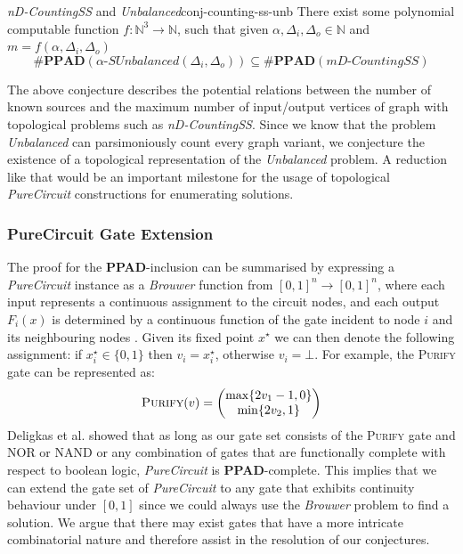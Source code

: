 \begin{conjecturebox}{\textit{nD-CountingSS} and \textit{Unbalanced}}{conj-counting-ss-unb}
    There exist some polynomial computable function $f :\mathbb{N}^3 \to \mathbb{N}$, such that
    given $\alpha,\Delta_i, \Delta_o \in \mathbb{N}$ and $m= f(\alpha, \Delta_i, \Delta_o)$
    $$
        \textbf{\#PPAD}(\alpha\textit{-SUnbalanced}(\Delta_i, \Delta_o)) \subseteq
        \textbf{\#PPAD}(m\textit{D-CountingSS})
    $$
\end{conjecturebox}
The above conjecture describes the potential relations between the number of known sources and the
maximum number of input/output vertices of graph with topological problems
such as \textit{nD-CountingSS}. Since we know that the problem \textit{Unbalanced}
can parsimoniously count every graph variant, we conjecture the existence of a topological representation
of the \textit{Unbalanced} problem. A reduction like that would be an important milestone for the usage of topological \textit{PureCircuit} constructions
for enumerating solutions.


\subsubsection{PureCircuit Gate Extension} 

The proof for the \textbf{PPAD}-inclusion can be summarised by expressing a \textit{PureCircuit} instance
as a \textit{Brouwer} function from $[0,1]^n \to [0,1]^n$, where
each input represents a continuous assignment to the circuit nodes,
and each output $F_i(x)$ is determined by a continuous function of the gate incident to node $i$ and its neighbouring nodes
\cite{deligkas_PureCircuitTightInapproximability_2024}.
Given its fixed point $x^\star$
we can then denote the following assignment: if $x^\star_i \in \{0,1\}$ then $v_i = x^{\star}_i$, otherwise
$v_i = \bot$. For example, the \textsc{Purify} gate can be represented as:
$$
\textsc{Purify}(v) = \begin{pmatrix}
    \max\{2v_1 -1 , 0\} \\
    \min\{2v_2, 1\} \\
\end{pmatrix}
$$
Deligkas et al. \cite{deligkas_PureCircuitTightInapproximability_2024} 
showed that as long as our gate set consists of the \textsc{Purify} gate and \textsc{NOR} or \textsc{NAND}
or any combination of gates that are functionally complete with respect to boolean logic,
\textit{PureCircuit}  is \textbf{PPAD}-complete.
This implies that we can extend the gate set of \textit{PureCircuit} to any gate that exhibits
continuity behaviour under $[0,1]$ since we could always use the \textit{Brouwer} problem
to find a solution. We argue that there may exist gates that have 
a more intricate combinatorial nature and therefore assist in the resolution of our conjectures.

